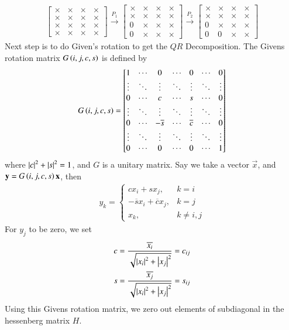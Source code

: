 \documentclass[journal]{IEEEtran}
\begin{document}
\begin{align}
\begin{bmatrix}
\times & \times & \times & \times \\
\times & \times & \times & \times \\
\times & \times & \times & \times \\
\times & \times & \times & \times
\end{bmatrix}
\xrightarrow{P_1}
\begin{bmatrix}
\times & \times & \times & \times \\
\times & \times & \times & \times \\
0 & \times & \times & \times \\
0 & \times & \times & \times
\end{bmatrix}
\xrightarrow{P_2}
\begin{bmatrix}
\times & \times & \times & \times \\
\times & \times & \times & \times \\
0 & \times & \times & \times \\
0 & 0 & \times & \times
\end{bmatrix}
\end{align}
Next step is to do Given's rotation to get the $QR$ Decomposition.
\newline
The Givens rotation matrix $G\left(i, j, c, s\right)$ is defined by
\begin{align}
G\left(i, j, c, s\right) = \begin{bmatrix}
1 & \cdots & 0 & \cdots & 0 & \cdots & 0 \\
\vdots & \ddots & \vdots & \ddots & \vdots & \ddots & \vdots \\
0 & \cdots & c & \cdots & s & \cdots & 0 \\
\vdots & \ddots & \vdots & \ddots & \vdots & \ddots & \vdots \\
0 & \cdots & -\overline{s} & \cdots & \overline{c} & \cdots & 0 \\
\vdots & \ddots & \vdots & \ddots & \vdots & \ddots & \vdots \\
0 & \cdots & 0 & \cdots & 0 & \cdots & 1
\end{bmatrix}
\end{align}
where $\left\vert c\right\vert^2 + \left\vert s\right\vert^2 = 1$, and $G$ is a unitary matrix.
\newline
Say we take a vector $\vec{x}$, and $\mathbf{y} = G\left(i, j, c, s\right)\mathbf{x}$, then
\begin{align}
    y_k = \begin{cases}
        c x_i + s x_j, & k = i \\
        -\overline{s} x_i + \overline{c} x_j, & k = j \\
        x_k, & k \neq i, j
    \end{cases}
\end{align}
For $y_j$ to be zero, we set
\begin{align}
    c = \frac{\overline{x_i}}{\sqrt{\left\vert x_i\right\vert^2 + \left\vert x_j\right\vert^2}} = c_{ij}\\
    s = \frac{\overline{x_j}}{\sqrt{\left\vert x_i\right\vert^2 + \left\vert x_j\right\vert^2}} = s_{ij}
\end{align}
Using this Givens rotation matrix, we zero out elements of subdiagonal in the hessenberg matrix $H$.
\end{document}
